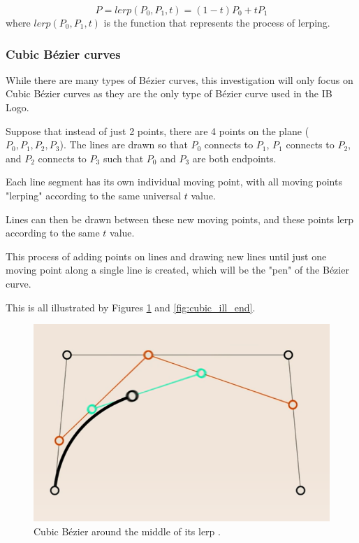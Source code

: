 \documentclass[letterpaper, 12pt]{article}
\begin{document}
\begin{equation}
    P = lerp(P_0, P_1, t) = (1-t)P_0 + tP_1
    \label{eq:lerp_def}
\end{equation}
where \(lerp(P_0, P_1, t)\) is the function that represents the
process of lerping.


\subsubsection{Cubic Bézier curves}

While there are many types of Bézier curves, this investigation will
only focus on Cubic Bézier curves as they are the only type of Bézier curve used in the IB Logo.

Suppose that instead of just 2 points, there are 4 points on the
plane (\(P_0, P_1, P_2, P_3\)). The lines are drawn so that
\(P_0\) connects to \(P_1\), \(P_1\) connects to \(P_2\), and
\(P_2\) connects to \(P_3\) such that \(P_0\) and \(P_3\) are both
endpoints.

Each line segment has its own individual moving point, with all moving
points "lerping" according to the same universal \(t\) value.

Lines can then be drawn between these new moving points, and
these points lerp according to the same \(t\) value.

This process of adding points on lines and drawing new lines
until just one moving point along a single line is created, which
will be the "pen" of the Bézier curve.

This is all illustrated by Figures \ref*{fig:cubic_ill_mid} and \ref*{fig:cubic_ill_end}.

\begin{figure}[H]
    \centering
    \includegraphics[width=.8\textwidth]{cubic_ill_mid.png}
    \caption{Cubic Bézier around the middle of its lerp \protect\cite{holmerBeautyBezierCurves2021}.}
    \label{fig:cubic_ill_mid}
\end{figure}
\end{document}
